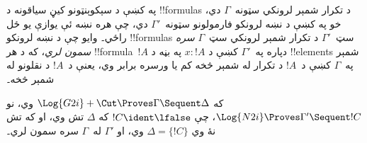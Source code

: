 \documentclass[../../../include/open-logic-section]{subfiles}
\begin{document}


په  کښې د سېکوېنټونو کيڼ سياقونه د !!{formula}s
د تکرار شمېر لرونکي سټونه~$\Gamma$ دي، خو په  کښې
د نښه لرونکو فارمولونو سټونه~$\Gamma'$ دي، چې هره نښه ئې
يوازې يو ځل راځي۔ وايو چې د نښه لرونکو !!{formula}s سټ~$\Gamma'$
د تکرار شمېر لرونکي سټ~$\Gamma$ \emph{سره سمون لري}، که د هر
!!{formula}~$!A$ دپاره په~$\Gamma'$ کښې د $x : !A$ په بڼه
د !!{element}s شمېر په~$\Gamma$ کښې د~$!A$ د تکرار له شمېر
څخه کم يا ورسره برابر وي، يعنې د~$!A$ د نقلونو له شمېر څخه۔

\begin{prop}
که $\Log{G2i} + \Cut \Proves \Gamma \Sequent \Delta$ وي، نو
$\Log{N2i} \Proves \Gamma' \Sequent !C$، چې $!C \ident \lfalse$
که $\Delta$ تش وي، او که تش نۀ وي $\Delta = \{!C\}$ وي، او
$\Gamma'$ له~$\Gamma$ سره سمون لري۔
\end{prop}
\end{document}
